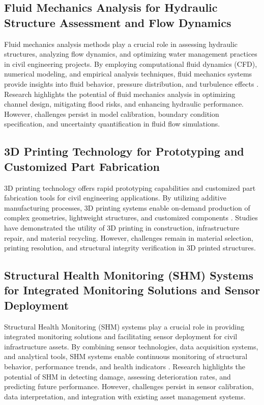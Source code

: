 \documentclass[journal, a4paper]{IEEEtran}
\begin{document}
\subsection{Fluid Mechanics Analysis for Hydraulic Structure Assessment and Flow Dynamics}
Fluid mechanics analysis methods play a crucial role in assessing hydraulic structures, analyzing flow dynamics,
and optimizing water management practices in civil engineering projects. By employing computational fluid dynamics (CFD),
numerical modeling, and empirical analysis techniques, fluid mechanics systems provide insights into fluid behavior,
pressure distribution, and turbulence effects \cite{katunin_identification_2021} \cite{li_physics-informed_2023} \cite{han_crack_2021}. Research highlights the potential of fluid mechanics
analysis in optimizing channel design, mitigating flood risks, and enhancing hydraulic performance. However, challenges
persist in model calibration, boundary condition specification, and uncertainty quantification in fluid flow simulations.

\subsection{3D Printing Technology for Prototyping and Customized Part Fabrication}
3D printing technology offers rapid prototyping capabilities and customized part fabrication tools for civil
engineering applications. By utilizing additive manufacturing processes, 3D printing systems enable on-demand
production of complex geometries, lightweight structures, and customized components \cite{de_menezes_defect_2021} \cite{wang_fatigue_2023} \cite{yifei_structure_2023}. Studies
have demonstrated the utility of 3D printing in construction, infrastructure repair, and material recycling.
However, challenges remain in material selection, printing resolution, and structural integrity verification in
3D printed structures. 

\subsection{Structural Health Monitoring (SHM) Systems for Integrated Monitoring Solutions and Sensor Deployment}
Structural Health Monitoring (SHM) systems play a crucial role in providing integrated monitoring solutions and
facilitating sensor deployment for civil infrastructure assets. By combining sensor technologies, data acquisition
systems, and analytical tools, SHM systems enable continuous monitoring of structural behavior, performance trends,
and health indicators \cite{zhang_structural_2021} \cite{zhang_defect_2020} \cite{bevan_automated_2022}. Research highlights the potential of SHM in detecting damage, assessing
deterioration rates, and predicting future performance. However, challenges persist in sensor calibration, data
interpretation, and integration with existing asset management systems.
\end{document}
